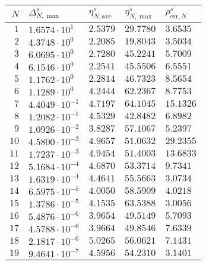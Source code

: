 \begin{table}[h!]
    \begin{center}
        \begin{tabular}{r|llll}
        $N$ & $\Delta^s_{N,\max}$ & $\eta^s_{N,\text{ave}}$ & $\eta^s_{N,\max}$ & $\rho^s_{\text{err}, N}$ \\
        \hline
            $1$ & $1.6574 \cdot 10^{1}$ & $2.5379$ & $29.7780$ & $3.6535$ \\
            $2$ & $4.3748 \cdot 10^{0}$ & $2.2085$ & $19.8043$ & $3.5034$ \\
            $3$ & $6.0695 \cdot 10^{0}$ & $2.7280$ & $45.2241$ & $5.7009$ \\
            $4$ & $6.1546 \cdot 10^{0}$ & $2.2541$ & $45.5506$ & $6.5551$ \\
            $5$ & $1.1762 \cdot 10^{0}$ & $2.2814$ & $46.7323$ & $8.5654$ \\
            $6$ & $1.1289 \cdot 10^{0}$ & $4.2444$ & $62.2367$ & $8.7753$ \\
            $7$ & $4.4049 \cdot 10^{-1}$ & $4.7197$ & $64.1045$ & $15.1326$ \\
            $8$ & $1.2082 \cdot 10^{-1}$ & $4.5329$ & $42.8482$ & $6.8982$ \\
            $9$ & $1.0926 \cdot 10^{-2}$ & $3.8287$ & $57.1067$ & $5.2397$ \\
            $10$ & $4.5800 \cdot 10^{-3}$ & $4.9657$ & $51.0632$ & $29.2355$ \\
            $11$ & $1.7237 \cdot 10^{-3}$ & $4.9454$ & $51.4003$ & $13.6833$ \\
            $12$ & $5.1684 \cdot 10^{-4}$ & $4.6870$ & $53.3714$ & $9.7341$ \\
            $13$ & $1.6319 \cdot 10^{-4}$ & $4.4641$ & $55.5663$ & $3.0734$ \\
            $14$ & $6.5975 \cdot 10^{-5}$ & $4.0050$ & $58.5909$ & $4.0218$ \\
            $15$ & $1.3786 \cdot 10^{-5}$ & $4.1535$ & $63.5388$ & $3.0056$ \\
            $16$ & $5.4876 \cdot 10^{-6}$ & $3.9654$ & $49.5149$ & $5.7093$ \\
            $17$ & $4.5788 \cdot 10^{-6}$ & $3.9664$ & $49.8546$ & $7.6339$ \\
            $18$ & $2.1817 \cdot 10^{-6}$ & $5.0265$ & $56.0621$ & $7.1431$ \\
            $19$ & $9.4641 \cdot 10^{-7}$ & $4.5956$ & $54.2310$ & $3.1401$ \\

\end{tabular}
\end{center}
\end{table}
